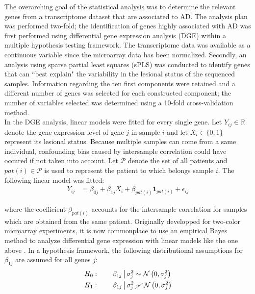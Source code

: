 \documentclass[journal, a4paper]{IEEEtran}
\def\one{\mathbf{1}}
\begin{document}
The overarching goal of the statistical analysis was to determine the relevant genes from a transcriptome dataset that are associated to AD. The analysis plan was performed two-fold; the identification of genes highly associated with AD was first performed using differential gene expression analysis (DGE) within a multiple hypothesis testing framework. The transcriptome data was available as a continuous variable since the microarray data has been normalized. Secondly, an analysis using sparse partial least squares (sPLS) was conducted to identify genes that can ``best explain" the variability in the lesional status of the sequenced samples. Information regarding the ten first components were retained and a different number of genes was selected for each constructed component; the number of variables selected was determined using a 10-fold cross-validation method.\\

In the DGE analysis, linear models were fitted for every single gene. Let $Y_{ij} \in \mathbb{R}$ denote the gene expression level of gene $j$ in sample $i$ and let $X_i \in \{0, 1\}$ represent its lesional status. Because multiple samples can come from a same individual, confounding bias caused by intersample correlation could have occured if not taken into account. Let $\mathcal{P}$ denote the set of all patients and $pat(i) \in \mathcal{P}$ is used to represent the patient to which belongs sample $i$. The following linear model was fitted:
\begin{align*}
  Y_{ij} &=\beta_{0j} + \beta_{1j}X_i + \beta_{pat(i)}\one_{pat(i)} + \epsilon_{ij}
\end{align*}

\noindent where the coefficient $\beta_{pat(i)}$ accounts for the intersample correlation for samples which are obtained from the same patient. Originally developped for two-color microarray experiments, it is now commonplace to use an empirical Bayes method to analyze differential gene expression with linear models like the one above \cite{smyth2004linear}. In a hypothesis framework, the following distributional assumptions for $\beta_{1j}$ are assumed for all genes $j$:
\begin{align*}
  H_0:\qquad \beta_{1j} \,\big\vert\, \sigma^2_j &\sim \mathcal{N}\left(0, \sigma^2_j\right)\\
  H_1:\qquad \beta_{1j} \,\big\vert\, \sigma^2_j &\,\,\cancel{\sim}\,\, \mathcal{N}\left(0, \sigma^2_j\right)
\end{align*}
\end{document}
